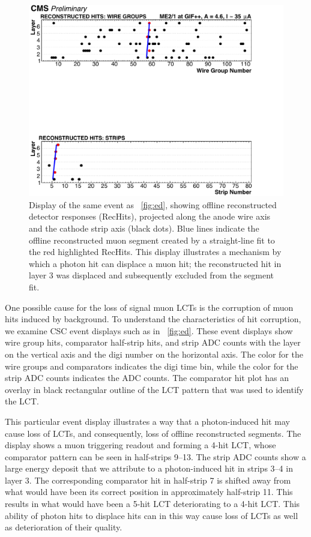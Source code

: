 \begin{figure}
	\centering
	\includegraphics[width=\dummyFigWidth]{figures/neutron/RH_GIF_3384_ME21_9.pdf}
	\caption{Display of the same event as \FigDot~\ref{fig:ed}, showing offline reconstructed detector responses (RecHits), projected along the anode wire axis and the cathode strip axis (black dots). Blue lines indicate the offline reconstructed muon segment created by a straight-line fit to the red highlighted RecHits. This display illustrates a mechanism by which a photon hit can displace a muon hit; the reconstructed hit in layer 3 was displaced and subsequently excluded from the segment fit.}
	\label{fig:rh}
\end{figure}

One possible cause for the loss of signal muon LCTs is the corruption of muon hits induced by background. To understand the characteristics of hit corruption, we examine CSC event displays such as in \FigDot~\ref{fig:ed}. These event displays show wire group hits, comparator half-strip hits, and strip ADC counts with the layer on the vertical axis and the digi number on the horizontal axis. The color for the wire groups and comparators indicates the digi time bin, while the color for the strip ADC counts indicates the ADC counts. The comparator hit plot has an overlay in black rectangular outline of the LCT pattern that was used to identify the LCT.

This particular event display illustrates a way that a photon-induced hit may cause loss of LCTs, and consequently, loss of offline reconstructed segments. The display shows a muon triggering readout and forming a 4-hit LCT, whose comparator pattern can be seen in half-strips 9--13. The strip ADC counts show a large energy deposit that we attribute to a photon-induced hit in strips 3--4 in layer 3. The corresponding comparator hit in half-strip 7 is shifted away from what would have been its correct position in approximately half-strip 11. This results in what would have been a 5-hit LCT deteriorating to a 4-hit LCT. This ability of photon hits to displace hits can in this way cause loss of LCTs as well as deterioration of their quality.

